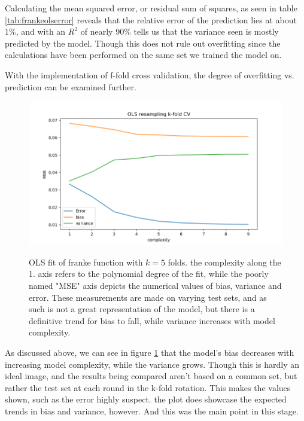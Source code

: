 \documentclass[ 12pt, a4paper ]{article}
\begin{document}
Calculating the mean squared error, or residual sum of squares, as seen in table 
\ref{tab:frankeolserror} reveals that the relative error of the prediction lies at about 1\%, 
and with an $R^2$ of nearly 90\% tells us that the variance seen is mostly predicted by the 
model. Though this does not rule out overfitting since the calculations have been performed on 
the same set we trained the model on. 


With the implementation of f-fold cross validation, the degree of overfitting vs. prediction can
be examined further.

\begin{figure}
\includegraphics[scale=0.7]{frankeolsbiasvariance.png}
\label{fig:frankeolsbiasvariance}
\caption{
    OLS fit of franke function with $k=5$ folds. the complexity along the 1. axis refers
    to the polynomial degree of the fit, while the poorly named "MSE" axis depicts the 
    numerical values of bias, variance and error. These measurements are made on varying test
    sets, and as such is not a great representation of the model, but there is a definitive 
    trend for bias to fall, while variance increases with model complexity.
}
\end{figure}

As discussed above, we can see in figure \ref{fig:frankeolsbiasvariance} that the model's 
bias decreases with increasing model complexity, while the variance grows. Though this is 
hardly an ideal image, and the results being compared aren't based on a common set, but 
rather the test set at each round in the k-fold rotation. This makes the values shown, such 
as the error highly suspect. the plot does showcase the expected trends in bias and variance, 
however. And this was the main point in this stage. \\
\end{document}
